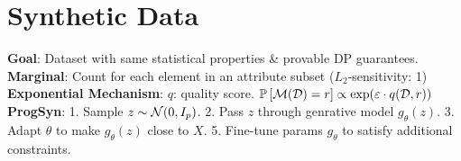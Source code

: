 \section{Synthetic Data}
\textbf{Goal}: Dataset with same statistical properties \& provable DP guarantees.\\
\textbf{Marginal}: Count for each element in an attribute subset ($L_2$-sensitivity: 1)\\
\textbf{Exponential Mechanism}: $q$: quality score. $\mathbb{P}\left[\mathcal{M}(\mathcal{D})=r\right] \propto \exp(\varepsilon\cdot q(\mathcal{D},r))$\\
\textbf{ProgSyn}: 1. Sample $z\sim\mathcal{N}(0,I_p)$. 2. Pass $z$ through genrative model $g_\theta(z)$. 3. Adapt $\theta$ to make $g_\theta(z)$ close to $X$. 5. Fine-tune params $g_{\theta}$ to satisfy additional constraints.

